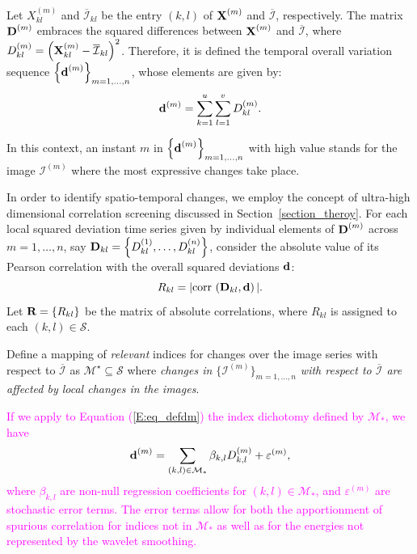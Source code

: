 \documentclass[journal]{IEEEtran}
\def\corr{\mbox{{\rm corr\,}}}
\newcommand{\vD}{{\textbf D}}
\newcommand{\vd}{{\textbf d}}
\newcommand{\vR}{{\textbf R}}
\newcommand{\vX}{{\textbf X}}
\begin{document}
Let $X_{kl}^{(m)}$ and $\overline{\mathcal{I}}_{kl}$ be the entry $(k,l)$ of $\vX^{(m)}$ and $\overline{\mathcal{I}}$, respectively. 
%
The matrix $\vD^{(m)}$ embraces the squared differences between $\vX^{(m)}$ and $\overline{\mathcal{I}}$, where $D_{kl}^{(m)} = \left( \vX_{kl}^{(m)} - \overline{\mathcal{I}}_{kl} \right)^2$.
%
Therefore, it is defined the temporal overall variation sequence $\left\lbrace \vd^{(m)}  \right\rbrace_{m=1,\ldots,n}$, whose elements are given by:
\begin{equation}\label{E:eq_defdm}
\vd^{(m)} = \sum_{k=1}^{u} \sum_{l=1}^{v} D_{kl}^{(m)}.
\end{equation}


In this context, an instant $m$ in $\left\lbrace \vd^{(m)}  \right\rbrace_{m=1,\ldots,n}$ with high value stands for the image $\mathcal{I}^{(m)}$ where the most expressive changes take place.



In order to identify spatio-temporal changes, we employ the concept of ultra-high dimensional correlation screening \cite{fan2020statistical} discussed in Section~\ref{section_theroy}. For each local squared deviation time series given by individual elements of $\vD^{(m)}$ across $m=1,\ldots,n$, say $\vD_{kl} = \left\lbrace D_{kl}^{(1)},\ldots,D_{kl}^{(n)} \right\rbrace$, consider the absolute value of its Pearson correlation with the overall squared deviations $\vd$:
\begin{equation}\label{def_Rkld}
R_{kl}= |\corr \left( \vD_{kl}, \vd \right)|.
\end{equation}
Let $\vR = \{R_{kl}\}$ be the matrix of absolute correlations, where $R_{kl}$ is assigned to each $(k,l) \in \mathcal{S}$.


Define a mapping of \textit{relevant} indices for changes over the image series with respect to $\overline{\mathcal I}$ as $\mathcal{M}^{\star} \subseteq \mathcal{S}$ where \textit{changes in $\{\mathcal{I}^{(m)}\}_{m=1,\ldots,n}$ with respect to $\overline{\mathcal{I}}$ are affected by local changes in the images}.


\textcolor{magenta}{
If we apply to Equation (\ref{E:eq_defdm}) the index dichotomy defined by $\mathcal{M}_*$, we have
\begin{align}
\vd^{(m)}=\sum_{(k,l)\in\mathcal{M}_*}\beta_{k,l}D_{k,l}^{(m)}+\varepsilon^{(m)}, \label{Regressao}
\end{align}
where $\beta_{k,l}$ are non-null regression coefficients for $(k,l)\in\mathcal{M}_*$, and $\varepsilon^{(m)}$ are stochastic error terms. 
The error terms allow for both the apportionment of spurious correlation for indices not in $\mathcal{M}_*$ as well as for the energies not represented by the wavelet smoothing.
} 
\end{document}
